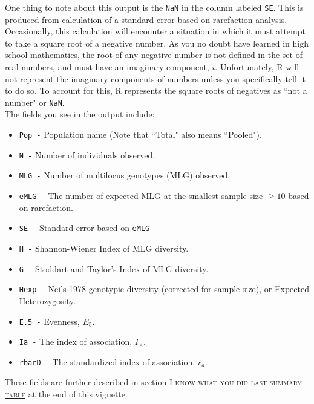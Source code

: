 \documentclass[letterpaper]{article}\usepackage[]{graphicx}\usepackage[]{color}
\newcommand{\seclink}[2]{
  \textsc{\hyperref[#1]{#2}}
}
\begin{document}
One thing to note about this output is the \texttt{NaN} in the column labeled \texttt{SE}. This is produced from calculation of a standard error based on rarefaction analysis. Occasionally, this calculation will encounter a situation in which it must attempt to take a square root of a negative number. As you no doubt have learned in high school mathematics, the root of any negative number is not defined in the set of real numbers, and must have an imaginary component, $i$. Unfortunately, R will not represent the imaginary components of numbers unless you specifically tell it to do so. To account for this, R represents the square roots of negatives as ``not a number" or \texttt{NaN}.\\
The fields you see in the output include:
\begin{itemize}
  \item \texttt{Pop -} Population name (Note that ``Total" also means ``Pooled").
  \item \texttt{N -} Number of individuals observed.
  \item \texttt{MLG -} Number of multilocus genotypes (MLG) observed.
  \item \texttt{eMLG -} The number of expected MLG at the smallest sample size $\geq 10$ based on rarefaction. \cite{Hurlbert:1971}
  \item \texttt{SE -} Standard error based on \texttt{eMLG} \cite{Heck:1975}
  \item \texttt{H -} Shannon-Wiener Index of MLG diversity. \cite{Shannon:1948}
  \item \texttt{G -} Stoddart and Taylor's Index of MLG diversity. \cite{Stoddart:1988}
  \item \texttt{Hexp -} Nei's 1978 genotypic diversity (corrected for sample size), or  Expected Heterozygosity. \cite{Nei:1978}
  \item \texttt{E.5 -} Evenness, $E_5$. \cite{Pielou:1975}\cite{Ludwig:1988}\cite{Grunwald:2003}
  \item \texttt{Ia -} The index of association, $I_A$. \cite{Brown:1980} \cite{Smith:1993} \cite{Agapow:2001}
  \item \texttt{rbarD -} The standardized index of association, $\bar r_d$. \cite{Agapow:2001}
\end{itemize}

These fields are further described in section\seclink{summary}{I know what you did last summary table}at the end of this vignette. 

%
\end{document}
